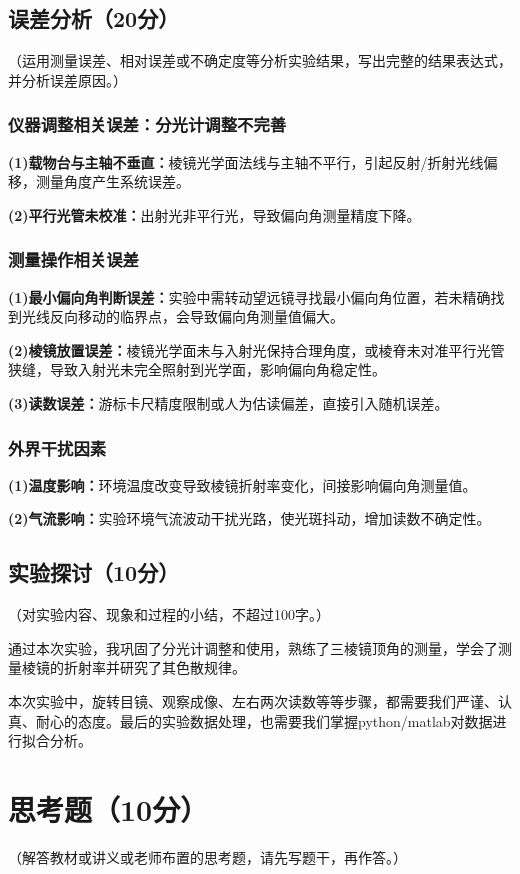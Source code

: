 \documentclass[]{../template/Report}%
\begin{document}
\begin{fullreportonly}
\subsection{误差分析（20分）}
（运用测量误差、相对误差或不确定度等分析实验结果，写出完整的结果表达式，并分析误差原因。）
\subsubsection{仪器调整相关误差：分光计调整不完善}
\textbf{(1)载物台与主轴不垂直：}棱镜光学面法线与主轴不平行，引起反射/折射光线偏移，测量角度产生系统误差。
\par
\textbf{(2)平行光管未校准：}出射光非平行光，导致偏向角测量精度下降。

\subsubsection{测量操作相关误差}
\textbf{(1)最小偏向角判断误差：}实验中需转动望远镜寻找最小偏向角位置，若未精确找到光线反向移动的临界点，会导致偏向角测量值偏大。
\par
\textbf{(2)棱镜放置误差：}棱镜光学面未与入射光保持合理角度，或棱脊未对准平行光管狭缝，导致入射光未完全照射到光学面，影响偏向角稳定性。
\par
\textbf{(3)读数误差：}游标卡尺精度限制或人为估读偏差，直接引入随机误差。

\subsubsection{外界干扰因素}
\textbf{(1)温度影响：}环境温度改变导致棱镜折射率变化，间接影响偏向角测量值。
\par
\textbf{(2)气流影响：}实验环境气流波动干扰光路，使光斑抖动，增加读数不确定性。



\subsection{实验探讨（10分）}
（对实验内容、现象和过程的小结，不超过100字。）
\par
通过本次实验，我巩固了分光计调整和使用，熟练了三棱镜顶角的测量，学会了测量棱镜的折射率并研究了其色散规律。
\par
本次实验中，旋转目镜、观察成像、左右两次读数等等步骤，都需要我们严谨、认真、耐心的态度。最后的实验数据处理，也需要我们掌握python/matlab对数据进行拟合分析。



\section{思考题（10分）}
（解答教材或讲义或老师布置的思考题，请先写题干，再作答。）

\end{fullreportonly}
\end{document}
